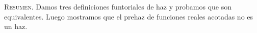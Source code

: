 \textsc{Resumen.} Damos tres definiciones funtoriales de haz y probamos que son equivalentes. Luego mostramos que el prehaz de funciones reales acotadas no es un haz. 
